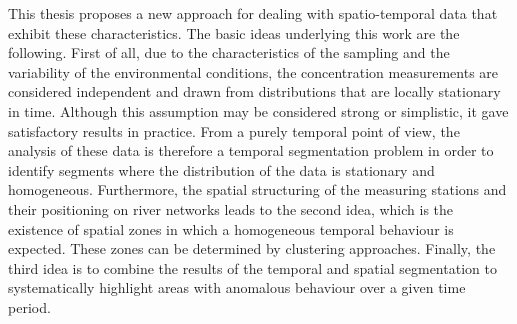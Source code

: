 This thesis proposes a new approach for dealing with spatio-temporal data that exhibit these characteristics.  The basic ideas underlying this work are the following. First of all, due to the characteristics of the sampling and the variability of the environmental conditions, the concentration measurements are considered independent and drawn from distributions that are locally stationary in time. Although this assumption may be considered strong or simplistic, it gave satisfactory results in practice. From a purely temporal point of view, the analysis of these data is therefore a temporal segmentation problem in order to identify segments where the distribution of the data is stationary and homogeneous. Furthermore, the spatial structuring of the measuring stations and their positioning on river networks leads to the second idea, which is the existence of spatial zones in which a homogeneous temporal behaviour is expected. These zones can be determined by clustering approaches. Finally, the third idea is to combine the results of the temporal and spatial segmentation to systematically highlight areas with anomalous behaviour over a given time period.




